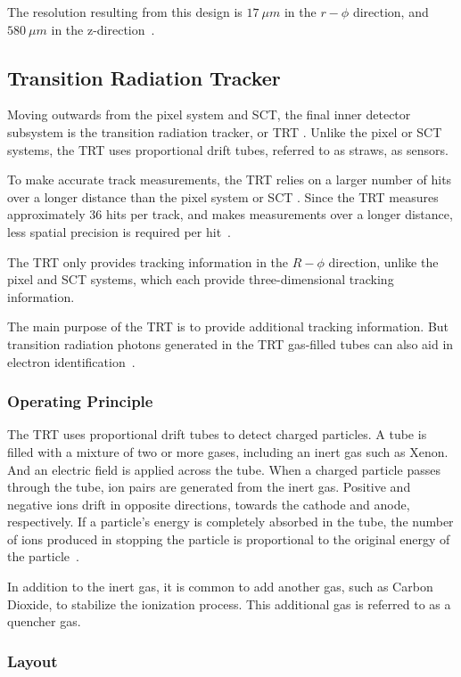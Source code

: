 The resolution resulting from this design is $17~\mu m$ in the $r-\phi$ direction, and $580~\mu m$ in the z-direction~\cite{sct-2010}.

\subsection{Transition Radiation Tracker}\label{subsec:trt}
Moving outwards from the pixel system and SCT, the final inner detector subsystem is the transition radiation tracker, or TRT .
Unlike the pixel or SCT systems, the TRT uses proportional drift tubes, referred to as straws, as sensors.

To make accurate track measurements, the TRT relies on a larger number of hits over a longer distance than the pixel system or SCT .
Since the TRT measures approximately 36 hits per track, and makes measurements over a longer distance,
less spatial precision is required per hit~\cite{atlas-detector-2008}.

The TRT only provides tracking information in the $R-\phi$ direction, unlike the pixel and SCT systems,
which each provide three-dimensional tracking information.

The main purpose of the TRT is to provide additional tracking information.
But transition radiation photons generated in the TRT gas-filled tubes can also aid in electron identification~\cite{atlas-detector-2008}.

\subsubsection{Operating Principle}
The TRT uses proportional drift tubes to detect charged particles.
A tube is filled with a mixture of two or more gases, including an inert gas such as Xenon.
And an electric field is applied across the tube.
When a charged particle passes through the tube, ion pairs are generated from the inert gas.
Positive and negative ions drift in opposite directions, towards the cathode and anode, respectively.
If a particle's energy is completely absorbed in the tube, the number of ions produced in stopping the particle is
proportional to the original energy of the particle~\cite{knoll-2000}.

In addition to the inert gas, it is common to add another gas, such as Carbon Dioxide, to stabilize the ionization process.
This additional gas is referred to as a quencher gas.

\subsubsection{Layout}

